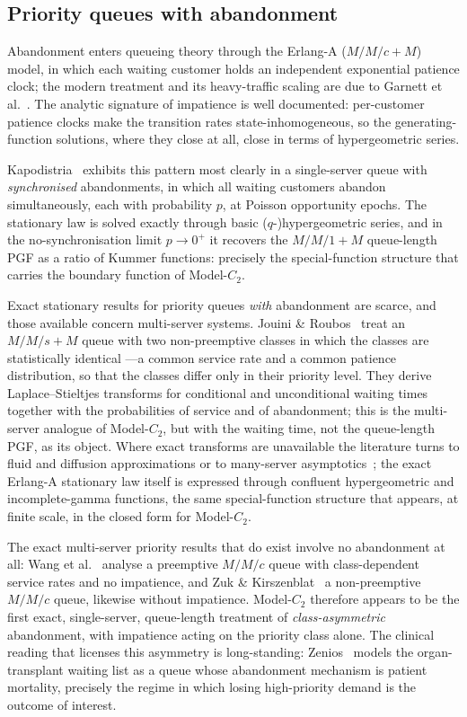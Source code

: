 \subsection*{Priority queues with abandonment}

Abandonment enters queueing theory through the Erlang-A ($M/M/c+M$) model, in which each waiting customer holds an independent exponential patience clock; the modern treatment and its heavy-traffic scaling are due to Garnett et al.~\cite{garnett2002designing}. The analytic signature of impatience is well documented: per-customer patience clocks make the transition rates state-inhomogeneous, so the generating-function solutions, where they close at all, close in terms of hypergeometric series.

Kapodistria~\cite{kapodistria2011synchronized} exhibits this pattern most clearly in a single-server queue with \emph{synchronised} abandonments, in which all waiting customers abandon simultaneously, each with probability $p$, at Poisson opportunity epochs. The stationary law is solved exactly through basic ($q$-)hypergeometric series, and in the no-synchronisation limit $p\to0^+$ it recovers the $M/M/1+M$ queue-length PGF as a ratio of Kummer functions: precisely the special-function structure that carries the boundary function of Model-$C_2$.

Exact stationary results for priority queues \emph{with} abandonment are scarce, and those available concern multi-server systems. Jouini \& Roubos~\cite{jouini2014multiple} treat an $M/M/s+M$ queue with two non-preemptive classes in which the classes are statistically identical ---a common service rate and a common patience distribution, so that the classes differ only in their priority level. They derive Laplace--Stieltjes transforms for conditional and unconditional waiting times together with the probabilities of service and of abandonment; this is the multi-server analogue of Model-$C_2$, but with the waiting time, not the queue-length PGF, as its object. Where exact transforms are unavailable the literature turns to fluid and diffusion approximations or to many-server asymptotics~\cite{zeltyn2005callcenters}; the exact Erlang-A stationary law itself is expressed through confluent hypergeometric and incomplete-gamma functions, the same special-function structure that appears, at finite scale, in the closed form for Model-$C_2$.

The exact multi-server priority results that do exist involve no abandonment at all: Wang et al.~\cite{wang2015mmc} analyse a preemptive $M/M/c$ queue with class-dependent service rates and no impatience, and Zuk \& Kirszenblat~\cite{zuk2023explicit} a non-preemptive $M/M/c$ queue, likewise without impatience. Model-$C_2$ therefore appears to be the first exact, single-server, queue-length treatment of \emph{class-asymmetric} abandonment, with impatience acting on the priority class alone. The clinical reading that licenses this asymmetry is long-standing: Zenios~\cite{zenios1999modeling} models the organ-transplant waiting list as a queue whose abandonment mechanism is patient mortality, precisely the regime in which losing high-priority demand is the outcome of interest.


